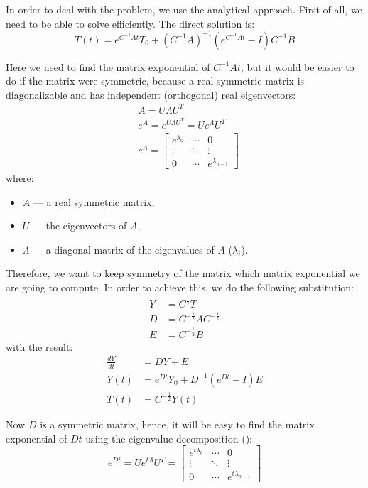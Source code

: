 In order to deal with the problem, we use the analytical approach. First of all, we need to be able to solve  efficiently. The direct solution is:
\begin{equation} \label{eq:solution}
  T(t) = e^{C^{-1}At}T_{0} + (C^{-1}A)^{-1}(e^{C^{-1}At} - I)C^{-1}B
\end{equation}

Here we need to find the matrix exponential of $C^{-1} At$, but it would be easier to do if the matrix were symmetric, because a real symmetric matrix is diagonalizable and has independent (orthogonal) real eigenvectors:
\begin{align}
  & A = U \Lambda U^T \label{eq:eigenvalue-decomposition} \\
  & e^A = e^{U \Lambda U^T} = U e^{\Lambda} U^T \nonumber \\
  & e^{\Lambda} = \left[
      \begin{array}{ccc}
        e^{\lambda_0} & \cdots & 0 \\
        \vdots & \ddots & \vdots \\
        0 & \cdots & e^{\lambda_{n - 1}}
      \end{array}
    \right] \nonumber
\end{align}
where:
\begin{itemize}
  \item $A$ --- a real symmetric matrix,
  \item $U$ --- the eigenvectors of $A$,
  \item $\Lambda$ --- a diagonal matrix of the eigenvalues of $A$ ($\lambda_i$).
\end{itemize}

Therefore, we want to keep symmetry of the matrix which matrix exponential we are going to compute. In order to achieve this, we do the following substitution:
\begin{align*}
  Y & = C^{\frac{1}{2}} T \\
  D & = C^{-\frac{1}{2}} A C^{-\frac{1}{2}} \\
  E & = C^{-\frac{1}{2}} B
\end{align*}
with the result:
\begin{align}
  \frac{dY}{dt} & = DY + E \nonumber \\
  Y(t) & = e^{Dt}Y_{0} + D^{-1}(e^{Dt} - I)E \label{eq:modified_solution} \\
  T(t) & = C^{-\frac{1}{2}} Y(t) \nonumber
\end{align}

Now $D$ is a symmetric matrix, hence, it will be easy to find the matrix exponential of $D t$ using the eigenvalue decomposition ():
\[
  e^{D t} = U e^{t \Lambda} U^T = \left[
      \begin{array}{ccc}
        e^{t \lambda_0} & \cdots & 0 \\
        \vdots & \ddots & \vdots \\
        0 & \cdots & e^{t \lambda_{n - 1}}
      \end{array}
    \right]
\]


